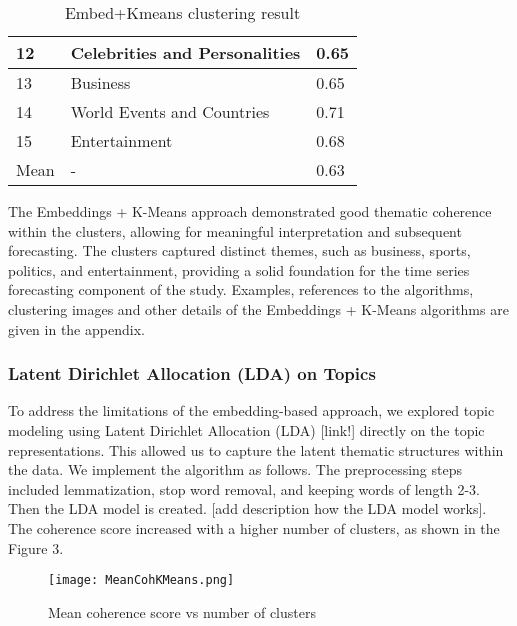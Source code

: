 \begin{table}[h]
\begin{tabular}{|l|l|l|}
12                                        & Celebrities and Personalities                                   & 0.65                                    \\ \hline
13                                        & Business                                                        & 0.65                                    \\ \hline
14                                        & World Events and Countries                                      & 0.71                                    \\ \hline
15                                        & Entertainment                                                   & 0.68                                    \\ \hline
Mean                                      & -                                                               & 0.63                                    \\ \hline
\end{tabular}
\caption{Embed+Kmeans clustering result}
\label{tab:KmeansClusters}
\end{table}

The Embeddings + K-Means approach demonstrated good thematic coherence within the clusters, allowing for meaningful interpretation and subsequent forecasting. The clusters captured distinct themes, such as business, sports, politics, and entertainment, providing a solid foundation for the time series forecasting component of the study.
Examples, references to the algorithms, clustering images and other details of the Embeddings + K-Means algorithms are given in the appendix.

\subsubsection{Latent Dirichlet Allocation (LDA) on Topics}

To address the limitations of the embedding-based approach, we explored topic modeling using Latent Dirichlet Allocation (LDA) [link!] directly on the topic representations. This allowed us to capture the latent thematic structures within the data.
We implement the algorithm as follows. The preprocessing steps included lemmatization, stop word removal, and keeping words of length 2-3. Then the LDA model is created. [add description how the LDA model works].
The coherence score increased with a higher number of clusters, as shown in the Figure 3.

\begin{figure}[h] 
    \centering
    \texttt{[image: MeanCohKMeans.png]}
    \label{fig:MeanCohKMeans}
    \caption{Mean coherence score vs number of clusters}
\end{figure}

